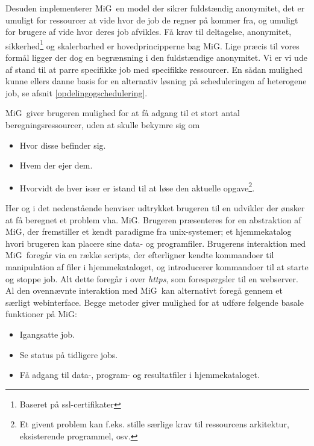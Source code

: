 \documentclass[draft,a4paper,11pt]{article}
\newcommand{\mig}{MiG}
\begin{document}
Desuden implementerer \mig\ en model der sikrer fuldstændig anonymitet, det er umuligt for ressourcer at vide hvor de job de regner på kommer fra, og umuligt for brugere af vide hvor deres job afvikles. Få krav til deltagelse, anonymitet, sikkerhed\footnote{Baseret på ssl-certifikater} og skalerbarhed er hovedprincipperne bag \mig. Lige præcis til vores formål ligger der dog en begrænsning i den fuldstændige anonymitet. Vi er vi ude af stand til at parre specifikke job med specifikke ressourcer. En sådan mulighed kunne ellers danne basis for en alternativ løsning på scheduleringen af heterogene job, se afsnit \ref{opdelingogschedulering}. 



\mig\ giver brugeren mulighed for at få adgang til et stort antal beregningsressourcer, uden at skulle bekymre sig om 
\begin{itemize}
	\item Hvor disse befinder sig.
	\item Hvem der ejer dem.
	\item Hvorvidt de hver især er istand til at løse den aktuelle opgave\footnote{Et givent problem kan f.eks. stille særlige krav til ressourcens arkitektur, eksisterende programmel, osv.}.
\end{itemize}
Her og i det nedenstående henviser udtrykket brugeren til en udvikler der ønsker at få beregnet et problem vha. \mig . Brugeren præsenteres for en abstraktion af \mig, der fremstiller et kendt paradigme fra unix-systemer; et hjemmekatalog hvori brugeren kan placere sine data- og programfiler. Brugerens interaktion med \mig\ foregår via en række scripts, der efterligner kendte kommandoer til manipulation af filer i hjemmekataloget, og introducerer kommandoer til at starte og stoppe job. Alt dette foregår i over \emph{https}, som forespørgsler til en webserver. Al den ovennævnte interaktion med \mig\ kan alternativt foregå gennem et særligt webinterface. 
Begge metoder giver mulighed for at udføre følgende basale funktioner på \mig:
\begin{itemize}
	\item Igangsatte job.

	\item Se status på tidligere jobs.

	\item Få adgang til data-, program- og resultatfiler i hjemmekataloget. 
\end{itemize}
\end{document}
